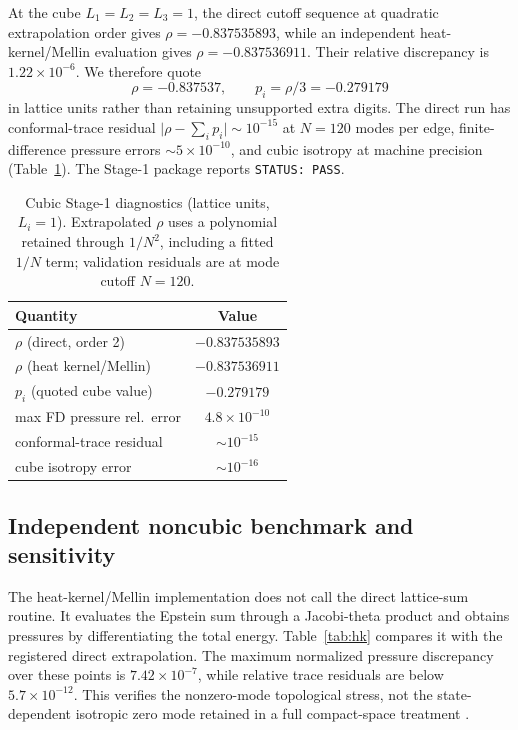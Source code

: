 \documentclass[aps,prd,reprint,superscriptaddress,nofootinbib,floatfix,showkeys]{revtex4-2}
\begin{document}
At the cube \(L_1=L_2=L_3=1\), the direct cutoff sequence at quadratic
extrapolation order gives \(\rho=-0.837535893\), while an independent
heat-kernel/Mellin evaluation gives \(\rho=-0.837536911\).  Their relative
discrepancy is \(1.22\times10^{-6}\).  We therefore quote
\begin{equation}
 \rho=-0.837537,\qquad
 p_i=\rho/3=-0.279179
\end{equation}
in lattice units rather than retaining unsupported extra digits.  The direct
run has conformal-trace residual
\(\lvert\rho-\sum_ip_i\rvert\sim 10^{-15}\) at \(N=120\) modes per edge,
finite-difference pressure errors \(\sim 5\times 10^{-10}\), and cubic
isotropy at machine precision (Table~\ref{tab:stage1}).
The Stage-1 package reports \texttt{STATUS: PASS}.

\begin{table}[tbp]
\caption{Cubic Stage-1 diagnostics (lattice units, \(L_i=1\)).
Extrapolated \(\rho\) uses a polynomial retained through \(1/N^2\), including
a fitted \(1/N\) term; validation residuals are at mode cutoff \(N=120\).}
\label{tab:stage1}
\begin{ruledtabular}
\begin{tabular}{lc}
Quantity & Value \\
\hline
\(\rho\) (direct, order 2) & \(-0.837535893\) \\
\(\rho\) (heat kernel/Mellin) & \(-0.837536911\) \\
\(p_i\) (quoted cube value) & \(-0.279179\) \\
max FD pressure rel.\ error & \(4.8\times 10^{-10}\) \\
conformal-trace residual & \(\sim 10^{-15}\) \\
cube isotropy error & \(\sim 10^{-16}\) \\
\end{tabular}
\end{ruledtabular}
\end{table}

\subsection{Independent noncubic benchmark and sensitivity}

The heat-kernel/Mellin implementation does not call the direct lattice-sum
routine.  It evaluates the Epstein sum through a Jacobi-theta product and
obtains pressures by differentiating the total energy.  Table~\ref{tab:hk}
compares it with the registered direct extrapolation.  The maximum normalized
pressure discrepancy over these points is \(7.42\times10^{-7}\), while relative
trace residuals are below \(5.7\times10^{-12}\).  This verifies the nonzero-mode
topological stress, not the state-dependent isotropic zero mode retained in a
full compact-space treatment \cite{negro2026}.
\end{document}
